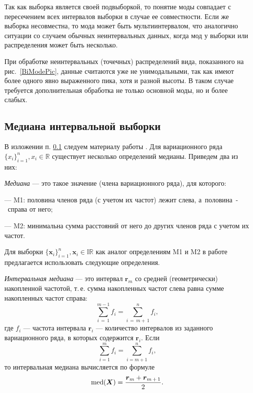 \documentclass[a5paper,openany]{book}
\newcommand{\mbf}[1]{\protect\text{\boldmath$#1$}}
\newcommand{\md}{\operatorname{med}}
\begin{document}
Так как выборка является своей подвыборкой, то понятие моды 
совпадает с пересечением всех интервалов выборки в случае ее совместности. 
Если же выборка несовместна, то мода может быть мультиинтервалом, что
аналогично ситуации со случаем обычных неинтервальных данных, когда мод у выборки или 
распределения может быть несколько.  

При обработке неинтервальных (точечных) распределений вида, показанного 
на рис.~\ref{BiModePic}, данные считаются уже не унимодальными, так как имеют 
более одного явно выраженного пика, хотя и разной высоты. 
В таком случае требуется дополнительная обработка не только основной моды, но и более слабых.




\subsection{Медиана  интервальной выборки} 
\label{MedSampleSect} 


В изложении п. \ref{MedSampleSect} следуем материалу работы \cite{MedianaProlubnikov}. 
Для вариационного ряда $\{x_i\}_{i=1}^n, x_i \in \mathbb{R}$ существует несколько определений медианы.
Приведем два из них:

\emph{Медиана} --- это такое значение (члена вариационного ряда), для которого:
\begin{list}{}{\leftmargin=10mm\itemsep=5pt\topsep=3pt\parsep=0pt} 
\item [---] M1: половина членов ряда (с учетом их частот) лежит слева, а~половина~-~справа от него; \label{text:me1}
\item [---] M2: минимальна сумма расстояний от него до других членов ряда с учетом их частот. \label{text:me2} 
\end{list} 
Для выборки $\{\boldsymbol{x}_i\}_{i=1}^n, \boldsymbol{x}_i \in \mathbb{IR}$ как аналог определениям M1 и M2 в  работе \cite{MedianaProlubnikov} предлагается использовать следующие определения.

\emph{Интервальная медиана} --- это интервал $\boldsymbol{r}_m$ со средней (геометрически) накопленной частотой, т.\,е. сумма накопленных частот слева равна сумме накопленных частот справа:
\begin{equation} \label{eq:SumLefteqSumRight}
\sum_{i\,=\,1}^{m-1}f_i = \sum_{i\,= \,m+ \,1}^n f_i,
\end{equation}
где $f_i$ --- частота интервала $\boldsymbol{r}_i$  --- количество интервалов из заданного вариационного ряда, в которых содержится $\boldsymbol{r}_i$.
Если 
\begin{equation*} 
\sum_{i=1}^{m}f_i = \sum_{i=m+1}^n f_i,
\end{equation*}
то интервальная медиана вычисляется по формуле
\begin{equation} \label{eq:SumLefteqSumRight2}
\md (\mbf{X}) = \frac{\boldsymbol{r}_m + \boldsymbol{r}_{m \, + \, 1}}{2}.
\end{equation}
\end{document}
